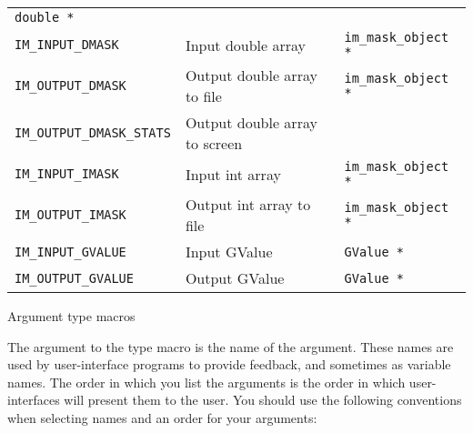\begin{tab2}
\begin{center}
\begin{tabular}{|l|l|l|}
	\texttt{double *} \\
\texttt{IM\_INPUT\_DMASK} 	& Input double array		& 
	\texttt{im\_mask\_object *} \\
\texttt{IM\_OUTPUT\_DMASK}	& Output double array to file	& 
	\texttt{im\_mask\_object *} \\
\texttt{IM\_OUTPUT\_DMASK\_STATS}& Output double array to screen & 
	\\
\texttt{IM\_INPUT\_IMASK}	& Input int array		& 
	\texttt{im\_mask\_object *} \\
\texttt{IM\_OUTPUT\_IMASK}	& Output int array to file	& 
	\texttt{im\_mask\_object *} \\
\texttt{IM\_INPUT\_GVALUE}	& Input GValue			& 
	\texttt{GValue *} \\
\texttt{IM\_OUTPUT\_GVALUE}	& Output GValue 		& 
	\texttt{GValue *} \\
\hline
\end{tabular}
\end{center}
\caption{Argument type macros\label{tab:type}}
\end{tab2}

The argument to the type macro is the name of the argument. These names
are used by user-interface programs to provide feedback, and sometimes as
variable names. The order in which you list the arguments is the order in
which user-interfaces will present them to the user. You should use the
following conventions when selecting names and an order for your arguments:

